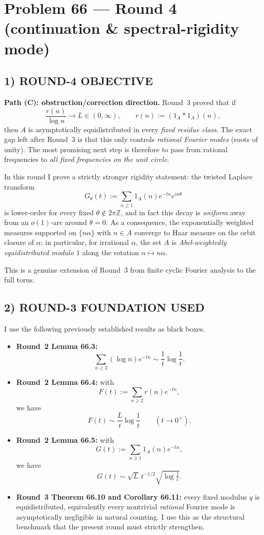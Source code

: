 \section{Problem 66 --- Round 4 (continuation \& spectral-rigidity mode)}

\subsection*{1) ROUND-4 OBJECTIVE}
\textbf{Path (C): obstruction/correction direction.}  Round~3 proved that if
\[
\frac{r(n)}{\log n}\to L\in(0,\infty),\qquad r(n):=(1_A\ast 1_A)(n),
\]
then $A$ is asymptotically equidistributed in every \emph{fixed residue class}.  The exact gap left after Round~3 is that this only controls \emph{rational Fourier modes} (roots of unity).  The most promising next step is therefore to pass from rational frequencies to \emph{all fixed frequencies on the unit circle}.  

In this round I prove a strictly stronger rigidity statement: the twisted Laplace transform
\[
G_\theta(t):=\sum_{n\ge 1}1_A(n)e^{-tn}e^{in\theta}
\]
is lower-order for every fixed $\theta\notin 2\pi\mathbb Z$, and in fact this decay is \emph{uniform} away from an $o(1)$-arc around $\theta=0$.  As a consequence, the exponentially weighted measures supported on $\{n\alpha\}$ with $n\in A$ converge to Haar measure on the orbit closure of $\alpha$; in particular, for irrational $\alpha$, the set $A$ is \emph{Abel-weightedly equidistributed modulo $1$} along the rotation $n\mapsto n\alpha$.

This is a genuine extension of Round~3 from finite cyclic Fourier analysis to the full torus.

\subsection*{2) ROUND-3 FOUNDATION USED}
I use the following previously established results as black boxes.
\begin{itemize}
\item \textbf{Round~2 Lemma 66.3:}
\[
\sum_{n\ge2}(\log n)e^{-tn}\sim \frac1t\log\frac1t.
\]
\item \textbf{Round~2 Lemma 66.4:} with
\[
F(t):=\sum_{n\ge 2} r(n)e^{-tn},
\]
we have
\[
F(t)\sim \frac{L}{t}\log\frac1t\qquad(t\to 0^+).
\]
\item \textbf{Round~2 Lemma 66.5:} with
\[
G(t):=\sum_{n\ge 1}1_A(n)e^{-tn},
\]
we have
\[
G(t)\sim \sqrt{L}\,t^{-1/2}\sqrt{\log\tfrac1t}.
\]
\item \textbf{Round~3 Theorem 66.10 and Corollary 66.11:} every fixed modulus $q$ is equidistributed, equivalently every nontrivial \emph{rational} Fourier mode is asymptotically negligible in natural counting.  I use this as the structural benchmark that the present round must strictly strengthen.
\end{itemize}

